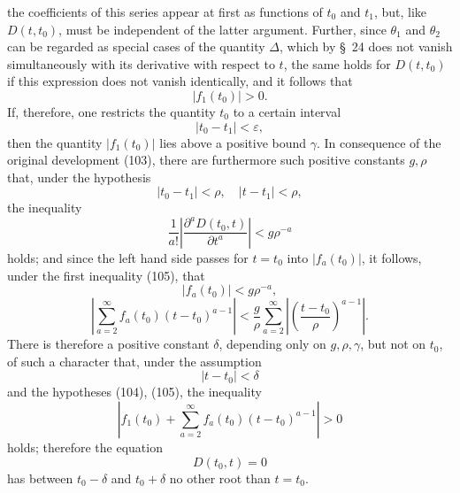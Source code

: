 \documentclass[11pt,a4paper,leqno]{article}
\begin{document}
the coefficients of this series appear at first as functions of $t_0$ and $t_1$, but, like $D(t,t_0)$, must be independent of the latter argument. Further, since $\theta_1$ and $\theta_2$ can be regarded as special cases of the quantity $\Delta$, which by \S~24 does not vanish simultaneously with its derivative with respect to $t$, the same holds for $D(t,t_0)$ if this expression does not vanish identically, and it follows that
\[
|f_1(t_0)|>0.
\]
If, therefore, one restricts the quantity $t_0$ to a certain interval
\begin{equation}\tag{104}
|t_0-t_1|<\varepsilon,
\end{equation}
then the quantity $|f_1(t_0)|$ lies above a positive bound $\gamma$. In consequence of the original development (103), there are furthermore such positive constants $g,\rho$ that, under the hypothesis
\begin{equation}\tag{105}
|t_0-t_1|<\rho,
\quad
|t-t_1|<\rho,
\end{equation}
the inequality
\[
\frac1{a!}\left|\frac{\partial^aD(t_0,t)}{\partial t^a}\right|<g\rho^{-a}
\]
holds; and since the left hand side passes for $t=t_0$ into $|f_a(t_0)|$, it follows, under the first inequality (105), that
\[
|f_a(t_0)|<g\rho^{-a},
\]
\[
\left|\sum_{a=2}^{\infty}f_a(t_0)(t-t_0)^{a-1}\right|
<\frac{g}{\rho}\sum_{a=2}^{\infty}\left|\left(\frac{t-t_0}{\rho}\right)^{a-1}\right|.
\]
There is therefore a positive constant $\delta$, depending only on $g,\rho,\gamma$, but not on $t_0$, of such a character that, under the assumption
\[
|t-t_0|<\delta
\]
and the hypotheses (104), (105), the inequality
\[
\left|f_1(t_0)+\sum_{a=2}^{\infty}f_a(t_0)(t-t_0)^{a-1}\right|>0
\]
holds; therefore the equation
\[
D(t_0,t)=0
\]
has between $t_0-\delta$ and $t_0+\delta$ no other root than $t=t_0$.
\end{document}
